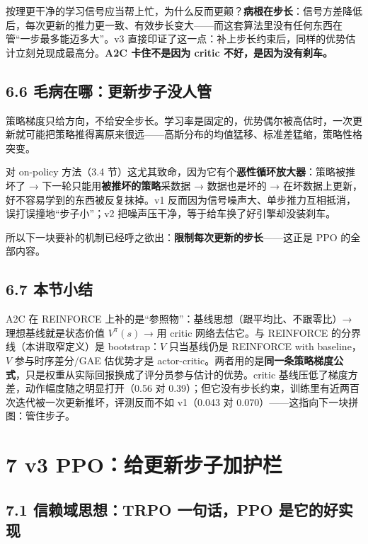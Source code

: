 \documentclass[
  chinese,
]{ctexart}
\begin{document}
按理更干净的学习信号应当帮上忙，为什么反而更颠？\textbf{病根在步长}：信号方差降低后，每次更新的推力更一致、有效步长变大------而这套算法里没有任何东西在管``一步最多能迈多大''。v3
直接印证了这一点：补上步长约束后，同样的优势估计立刻兑现成最高分。\textbf{A2C
卡住不是因为 critic 不好，是因为没有刹车。}

\subsection{6.6
毛病在哪：更新步子没人管}\label{ux6bdbux75c5ux5728ux54eaux66f4ux65b0ux6b65ux5b50ux6ca1ux4ebaux7ba1}

策略梯度只给方向，不给安全步长。学习率是固定的，优势偶尔被高估时，一次更新就可能把策略推得离原来很远------高斯分布的均值猛移、标准差猛缩，策略性格突变。

对 on-policy 方法（3.4
节）这尤其致命，因为它有个\textbf{恶性循环放大器}：策略被推坏了 →
下一轮只能用\textbf{被推坏的策略}采数据 → 数据也是坏的 →
在坏数据上更新，好不容易学到的东西被反复抹掉。v1
反而因为信号噪声大、单步推力互相抵消，误打误撞地``步子小''；v2
把噪声压干净，等于给车换了好引擎却没装刹车。

所以下一块要补的机制已经呼之欲出：\textbf{限制每次更新的步长}------这正是
PPO 的全部内容。

\subsection{6.7 本节小结}\label{ux672cux8282ux5c0fux7ed3-3}

A2C 在 REINFORCE 上补的是``参照物''：基线思想（跟平均比、不跟零比）→
理想基线就是状态价值 \(V^\pi(s)\) → 用 critic 网络去估它。与 REINFORCE
的分界线（本讲取窄定义）是 bootstrap：\(V\) 只当基线仍是 REINFORCE with
baseline，\(V\) 参与时序差分/GAE 估优势才是
actor-critic。两者用的是\textbf{同一条策略梯度公式}，只是权重从实际回报换成了评分员参与估计的优势。critic
基线压低了梯度方差，动作幅度随之明显打开（0.56 对
0.39）；但它没有步长约束，训练里有近两百次迭代被一次更新推坏，评测反而不如
v1（0.043 对 0.070）------这指向下一块拼图：管住步子。

\section{7 v3
PPO：给更新步子加护栏}\label{v3-ppoux7ed9ux66f4ux65b0ux6b65ux5b50ux52a0ux62a4ux680f}

\subsection{7.1 信赖域思想：TRPO 一句话，PPO
是它的好实现}\label{ux4fe1ux8d56ux57dfux601dux60f3trpo-ux4e00ux53e5ux8bddppo-ux662fux5b83ux7684ux597dux5b9eux73b0}
\end{document}
